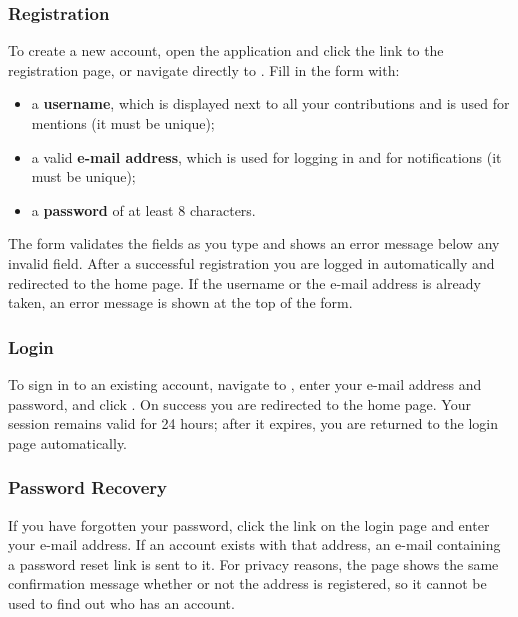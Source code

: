 \subsubsection*{Registration}

To create a new account, open the application and click the link to the registration
page, or navigate directly to . Fill in the form with:

\begin{itemize}
  \item a \textbf{username}, which is displayed next to all your contributions and is
    used for mentions (it must be unique);
  \item a valid \textbf{e-mail address}, which is used for logging in and for
    notifications (it must be unique);
  \item a \textbf{password} of at least 8 characters.
\end{itemize}

The form validates the fields as you type and shows an error message below any
invalid field. After a successful registration you are logged in automatically and
redirected to the home page. If the username or the e-mail address is already taken,
an error message is shown at the top of the form.


\subsubsection*{Login}

To sign in to an existing account, navigate to , enter your e-mail
address and password, and click . On success you are redirected to
the home page. Your session remains valid for 24 hours; after it expires, you are
returned to the login page automatically.


\subsubsection*{Password Recovery}

If you have forgotten your password, click the  link on the
login page and enter your e-mail address. If an account exists with that address, an
e-mail containing a password reset link is sent to it. For privacy reasons, the page
shows the same confirmation message whether or not the address is registered, so it
cannot be used to find out who has an account.

